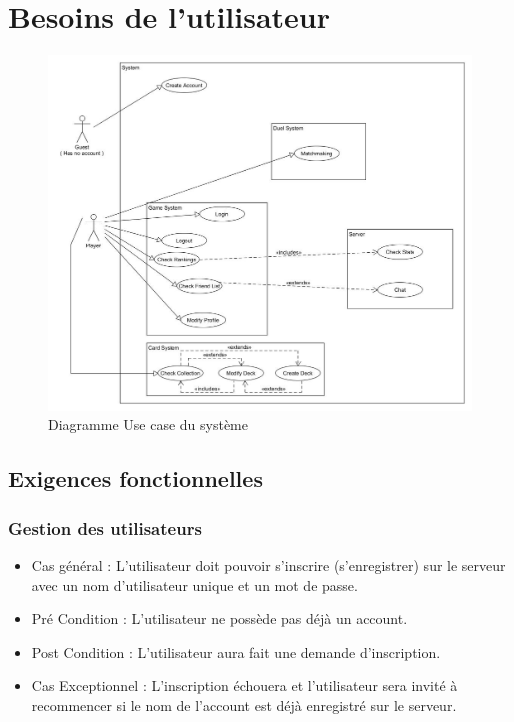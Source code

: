 \chapter{Besoins de l'utilisateur}
\begin{figure}[H]
    \includegraphics[width=\textwidth]{Images/UseCase.jpg}
    \caption{\label{Use Case} Diagramme Use case du système}
\end{figure}

\section{Exigences fonctionnelles}
\subsection{Gestion des utilisateurs}
\begin{itemize}
    \item Cas général  : L'utilisateur doit pouvoir s'inscrire (s'enregistrer) sur le {serveur} avec un nom d'utilisateur unique et un mot de passe.
    \item Pré Condition  : L'utilisateur ne possède pas déjà un account.
    \item Post Condition : L'utilisateur aura fait une demande d'inscription.
    \item Cas Exceptionnel : L'inscription échouera et l'utilisateur sera invité à recommencer si le nom de l'account est déjà enregistré sur le {serveur}.
\end{itemize}

